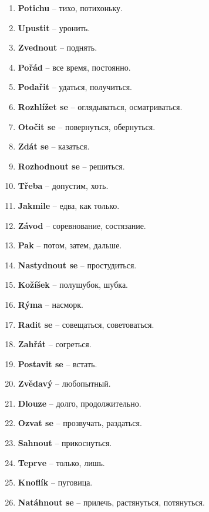 \documentclass[12pt]{book}
\begin{document}
\begin{enumerate}
    \item \textbf{Potichu} -- \textrussian{тихо, потихоньку}.
    \item \textbf{Upustit} -- \textrussian{уронить}.
    \item \textbf{Zvednout} -- \textrussian{поднять}.
    \item \textbf{Pořád} -- \textrussian{все время, постоянно}.
    \item \textbf{Podařit} -- \textrussian{удаться, получиться}.
    \item \textbf{Rozhlížet se} -- \textrussian{оглядываться, осматриваться}.
    \item \textbf{Otočit se} -- \textrussian{повернуться, обернуться}.
    \item \textbf{Zdát se} -- \textrussian{казаться}.
    \item \textbf{Rozhodnout se} -- \textrussian{решиться}.
    \item \textbf{Třeba} -- \textrussian{допустим, хоть}.
    \item \textbf{Jakmile} -- \textrussian{едва, как только}.
    \item \textbf{Závod} -- \textrussian{соревнование, состязание}.
    \item \textbf{Pak} -- \textrussian{потом, затем, дальше}.
    \item \textbf{Nastydnout se} -- \textrussian{простудиться}.
    \item \textbf{Kožíšek} -- \textrussian{полушубок, шубка}.
    \item \textbf{Rýma} -- \textrussian{насморк}.
    \item \textbf{Radit se} -- \textrussian{совещаться, советоваться}.
    \item \textbf{Zahřát} -- \textrussian{согреться}.
    \item \textbf{Postavit se} -- \textrussian{встать}.
    \item \textbf{Zvědavý} -- \textrussian{любопытный}.
    \item \textbf{Dlouze} -- \textrussian{долго, продолжительно}.
    \item \textbf{Ozvat se} -- \textrussian{прозвучать, раздаться}.
    \item \textbf{Sahnout} -- \textrussian{прикоснуться}.
    \item \textbf{Teprve} -- \textrussian{только, лишь}.
    \item \textbf{Knoflík} -- \textrussian{пуговица}.
    \item \textbf{Natáhnout se} -- \textrussian{прилечь, растянуться, потянуться}.

\end{enumerate}
\end{document}
